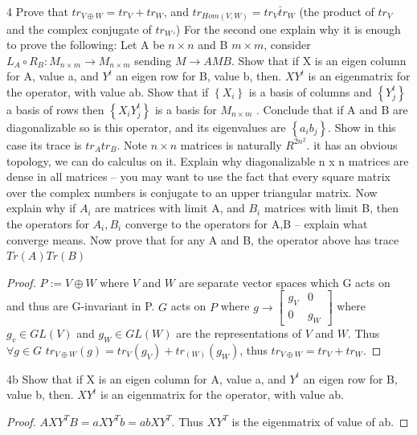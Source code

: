 \documentclass{article}
\begin{document}
\bigskip

\begin{PROB}{4}\label{Problem 4.}
    Prove that $tr_{V \oplus W} = tr_V +  tr_W$, and  $tr_{Hom(V,W)} = tr_V \bar tr_W$  (the product of $tr_V$ and the complex conjugate of $tr_W$.) For the second one explain why it is enough to prove the following: Let A be $n \times n$ and B $m \times m$, consider  $L_A \circ R_B : M_{n \times m} \to M_{n \times m}$ sending $M \to AMB$.  Show that if X is an eigen column for A, value a, and $Y^t$ an eigen row for B, value b, then.  $XY^t$ is an eigenmatrix for the operator, with value ab. Show that if $\left\{ X_i \right\}$ is a basis of columns and $\left\{ Y_j^t \right\}$  a basis of rows then $\left\{ X_i Y_j^t \right\}$ is a basis for $M_{n \times m}$ . Conclude that if A and B are diagonalizable so is this operator, and its eigenvalues are $\left\{ a_i b_j \right\}$. Show in this case its trace is $tr_A tr_B$. Note $n \times n$ matrices is naturally $R^{2n^2}$. it has an obvious topology, we can do calculus on it. Explain why diagonalizable n x n matrices are dense in all matrices -- you may want to use the fact that every square matrix over the complex numbers is conjugate to an upper triangular matrix. Now explain why if $A_i$ are matrices with limit A, and $B_i$ matrices with limit B, then the operators for $A_i, B_i$   converge to the operators for A,B -- explain what converge means.   Now prove that for any A and B, the operator above has trace $Tr(A) Tr(B)$ 
\end{PROB}
\begin{proof}
    $P := V \oplus W$ where $V$ and $W$ are separate vector spaces which G acts on and thus are G-invariant in P. $G$ acts on $P$ where $g \to \begin{bmatrix}
        g_V & 0 \\ 0 & g_W
    \end{bmatrix}$ where $g_v \in GL(V)$ and $g_W \in GL(W)$ are the representations of $V$ and $W$. Thus $\forall g \in G$  $tr_{V \oplus W}(g) = tr_{V}(g_V) + tr_(W)(g_W)$, thus $tr_{V \oplus W} = tr_V + tr_W$.        
\end{proof}
\begin{claim}{4b}\label{Claim 4b.}
    Show that if X is an eigen column for A, value a, and $Y^t$ an eigen row for B, value b, then.  $XY^t$ is an eigenmatrix for the operator, with value ab.  
\end{claim}
\begin{proof}
    $A X Y^T B = aXY^Tb = abXY^T$. Thus $XY^T$ is the eigenmatrix of value of ab.  
\end{proof}
\end{document}
